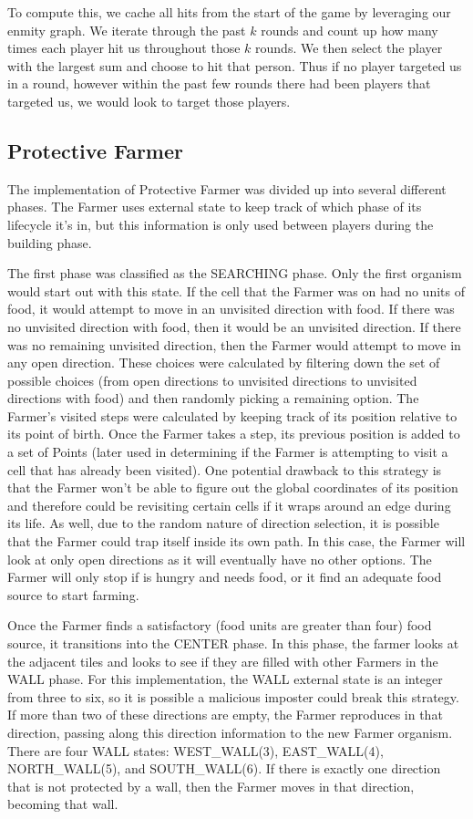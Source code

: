 \documentclass[
10pt, %
letterpaper, %
oneside, %
headinclude,footinclude, %
english
]{article}
\begin{document}
To compute this, we cache all hits from the start of the game by leveraging our enmity graph. We iterate through the past $k$ rounds and count up how many times each player hit us throughout those $k$ rounds. We then select the player with the largest sum and choose to hit that person. Thus if no player targeted us in a round, however within the past few rounds there had been players that targeted us, we would look to target those players. 

\subsection{Protective Farmer}
The implementation of Protective Farmer was divided up into several different phases. The Farmer uses external state to keep track of which phase of its lifecycle it's in, but this information is only used between players during the building phase.

The first phase was classified as the SEARCHING phase. Only the first organism would start out with this state. If the cell that the Farmer was on had no units of food, it would attempt to move in an unvisited direction with food. If there was no unvisited direction with food, then it would be an unvisited direction. If there was no remaining unvisited direction, then the Farmer would attempt to move in any open direction. These choices were calculated by filtering down the set of possible choices (from open directions to unvisited directions to unvisited directions with food) and then randomly picking a remaining option. The Farmer's visited steps were calculated by keeping track of its position relative to its point of birth. Once the Farmer takes a step, its previous position is added to a set of Points (later used in determining if the Farmer is attempting to visit a cell that has already been visited). One potential drawback to this strategy is that the Farmer won't be able to figure out the global coordinates of its position and therefore could be revisiting certain cells if it wraps around an edge during its life. As well, due to the random nature of direction selection, it is possible that the Farmer could trap itself inside its own path. In this case, the Farmer will look at only open directions as it will eventually have no other options. The Farmer will only stop if is hungry and needs food, or it find an adequate food source to start farming.

Once the Farmer finds a satisfactory (food units are greater than four) food source, it transitions into the CENTER phase. In this phase, the farmer looks at the adjacent tiles and looks to see if they are filled with other Farmers in the WALL phase. For this implementation, the WALL external state is an integer from three to six, so it is possible a malicious imposter could break this strategy. If more than two of these directions are empty, the Farmer reproduces in that direction, passing along this direction information to the new Farmer organism. There are four WALL states: WEST\_WALL(3), EAST\_WALL(4), NORTH\_WALL(5), and SOUTH\_WALL(6). If there is exactly one direction that is not protected by a wall, then the Farmer moves in that direction, becoming that wall.
\end{document}
